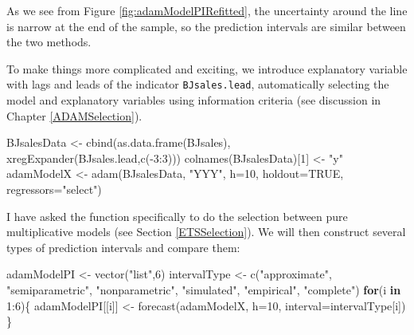 \documentclass[
]{book}
\newenvironment{Shaded}{\begin{snugshade}}{\end{snugshade}}
\newcommand{\AttributeTok}[1]{\textcolor[rgb]{0.77,0.63,0.00}{#1}}
\newcommand{\ConstantTok}[1]{\textcolor[rgb]{0.00,0.00,0.00}{#1}}
\newcommand{\ControlFlowTok}[1]{\textcolor[rgb]{0.13,0.29,0.53}{\textbf{#1}}}
\newcommand{\DecValTok}[1]{\textcolor[rgb]{0.00,0.00,0.81}{#1}}
\newcommand{\FunctionTok}[1]{\textcolor[rgb]{0.00,0.00,0.00}{#1}}
\newcommand{\NormalTok}[1]{#1}
\newcommand{\OtherTok}[1]{\textcolor[rgb]{0.56,0.35,0.01}{#1}}
\newcommand{\SpecialCharTok}[1]{\textcolor[rgb]{0.00,0.00,0.00}{#1}}
\newcommand{\StringTok}[1]{\textcolor[rgb]{0.31,0.60,0.02}{#1}}
\theoremstyle{definition}
\theoremstyle{definition}
\theoremstyle{definition}
\theoremstyle{definition}
\theoremstyle{remark}
\begin{document}
As we see from Figure \ref{fig:adamModelPIRefitted}, the uncertainty around the line is narrow at the end of the sample, so the prediction intervals are similar between the two methods.

To make things more complicated and exciting, we introduce explanatory variable with lags and leads of the indicator \texttt{BJsales.lead}, automatically selecting the model and explanatory variables using information criteria (see discussion in Chapter \ref{ADAMSelection}).

\begin{Shaded}
\begin{Highlighting}[]
\NormalTok{BJsalesData }\OtherTok{\textless{}{-}} \FunctionTok{cbind}\NormalTok{(}\FunctionTok{as.data.frame}\NormalTok{(BJsales),}
                     \FunctionTok{xregExpander}\NormalTok{(BJsales.lead,}\FunctionTok{c}\NormalTok{(}\SpecialCharTok{{-}}\DecValTok{3}\SpecialCharTok{:}\DecValTok{3}\NormalTok{)))}
\FunctionTok{colnames}\NormalTok{(BJsalesData)[}\DecValTok{1}\NormalTok{] }\OtherTok{\textless{}{-}} \StringTok{"y"}
\NormalTok{adamModelX }\OtherTok{\textless{}{-}} \FunctionTok{adam}\NormalTok{(BJsalesData, }\StringTok{"YYY"}\NormalTok{,}
                   \AttributeTok{h=}\DecValTok{10}\NormalTok{, }\AttributeTok{holdout=}\ConstantTok{TRUE}\NormalTok{,}
                   \AttributeTok{regressors=}\StringTok{"select"}\NormalTok{)}
\end{Highlighting}
\end{Shaded}

I have asked the function specifically to do the selection between pure multiplicative models (see Section \ref{ETSSelection}). We will then construct several types of prediction intervals and compare them:

\begin{Shaded}
\begin{Highlighting}[]
\NormalTok{adamModelPI }\OtherTok{\textless{}{-}} \FunctionTok{vector}\NormalTok{(}\StringTok{"list"}\NormalTok{,}\DecValTok{6}\NormalTok{)}
\NormalTok{intervalType }\OtherTok{\textless{}{-}} \FunctionTok{c}\NormalTok{(}\StringTok{"approximate"}\NormalTok{, }\StringTok{"semiparametric"}\NormalTok{,}
                  \StringTok{"nonparametric"}\NormalTok{, }\StringTok{"simulated"}\NormalTok{,}
                  \StringTok{"empirical"}\NormalTok{, }\StringTok{"complete"}\NormalTok{)}
\ControlFlowTok{for}\NormalTok{(i }\ControlFlowTok{in} \DecValTok{1}\SpecialCharTok{:}\DecValTok{6}\NormalTok{)\{}
\NormalTok{  adamModelPI[[i]] }\OtherTok{\textless{}{-}} \FunctionTok{forecast}\NormalTok{(adamModelX, }\AttributeTok{h=}\DecValTok{10}\NormalTok{,}
                               \AttributeTok{interval=}\NormalTok{intervalType[i])}
\NormalTok{\}}
\end{Highlighting}
\end{Shaded}
\end{document}
